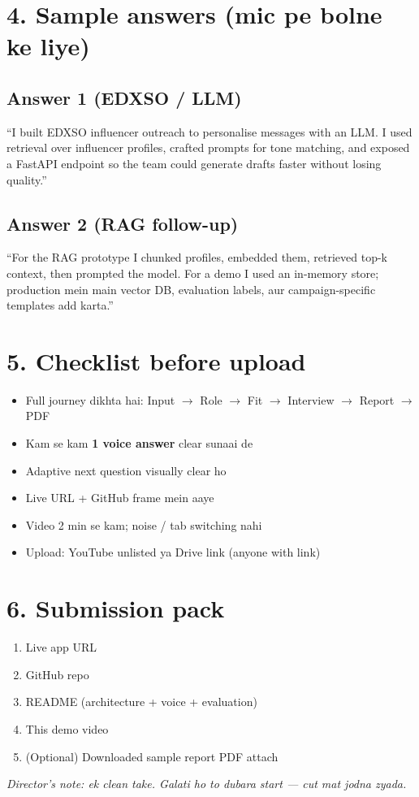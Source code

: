 \documentclass[11pt,a4paper]{article}
\begin{document}
\section*{4. Sample answers (mic pe bolne ke liye)}
\subsection*{Answer 1 (EDXSO / LLM)}
``I built EDXSO influencer outreach to personalise messages with an LLM. I used retrieval over influencer profiles, crafted prompts for tone matching, and exposed a FastAPI endpoint so the team could generate drafts faster without losing quality.''

\subsection*{Answer 2 (RAG follow-up)}
``For the RAG prototype I chunked profiles, embedded them, retrieved top-k context, then prompted the model. For a demo I used an in-memory store; production mein main vector DB, evaluation labels, aur campaign-specific templates add karta.''

\section*{5. Checklist before upload}
\begin{itemize}[leftmargin=1.2em,itemsep=0.15em]
  \item Full journey dikhta hai: Input $\rightarrow$ Role $\rightarrow$ Fit $\rightarrow$ Interview $\rightarrow$ Report $\rightarrow$ PDF
  \item Kam se kam \textbf{1 voice answer} clear sunaai de
  \item Adaptive next question visually clear ho
  \item Live URL + GitHub frame mein aaye
  \item Video 2 min se kam; noise / tab switching nahi
  \item Upload: YouTube unlisted ya Drive link (anyone with link)
\end{itemize}

\section*{6. Submission pack}
\begin{enumerate}[leftmargin=1.2em,itemsep=0.15em]
  \item Live app URL
  \item GitHub repo
  \item README (architecture + voice + evaluation)
  \item This demo video
  \item (Optional) Downloaded sample report PDF attach
\end{enumerate}

\vspace{1em}
\begin{center}
\textit{Director's note: ek clean take. Galati ho to dubara start --- cut mat jodna zyada.}
\end{center}
\end{document}
